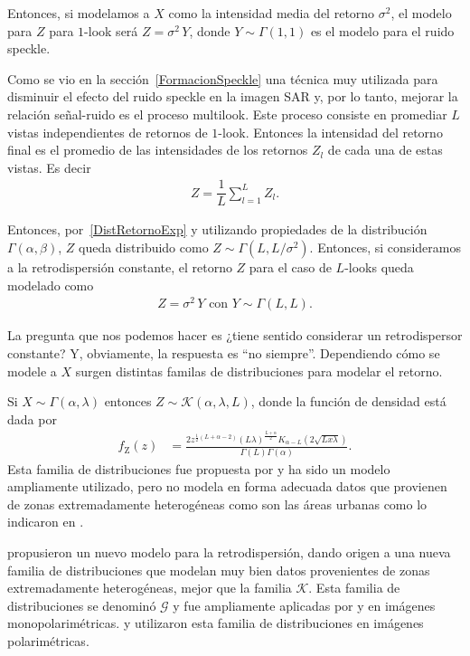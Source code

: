 Entonces, si modelamos a $X$ como la intensidad media del retorno $\sigma^2$, el modelo para $Z$ para $1$-look será $Z=\sigma^2 \, Y$, donde $Y \sim \Gamma(1,1)$ es el modelo para el ruido speckle.
 
Como se vio en la sección~\ref{FormacionSpeckle} una técnica muy utilizada para disminuir el efecto del ruido speckle en la imagen SAR y, por lo tanto, mejorar la relación señal-ruido es el proceso multilook. Este proceso consiste en promediar $L$ vistas independientes de retornos de $1$-look. Entonces la intensidad del retorno final es el promedio de las intensidades de los retornos $Z_l$ de cada una de estas vistas. Es decir 
\begin{align}
Z=\dfrac{1}{L}\sum_{l=1}^L Z_l.
\end{align}

Entonces, por~\eqref{DistRetornoExp} y utilizando propiedades de la distribución $\Gamma(\alpha,\beta)$, $Z$  queda distribuido como $Z \sim \Gamma(L,L/\sigma^2)$. Entonces, si consideramos a la retrodispersión constante, el retorno $Z$ para el caso de $L$-looks queda modelado como
\begin{align}
Z=\sigma^2 \, Y \text{ con } Y \sim \Gamma(L,L).
\end{align}

La pregunta que nos podemos hacer es ¿tiene sentido considerar un retrodispersor constante? Y, obviamente, la respuesta es ``no siempre''. 
Dependiendo cómo se modele a $X$ surgen distintas familas de distribuciones para modelar el retorno.

Si $X \sim \Gamma(\alpha,\lambda)$ entonces $Z \sim \mathcal{K}(\alpha,\lambda,L)$, donde la función de densidad está dada por
\begin{align}
f_{\text{Z}}(z)&=\frac{2 z^{\frac{1}{2} (L+\alpha-2 )} (L \lambda )^{\frac{L+\alpha }{2}} K_{\alpha -L}\left(2 \sqrt{L x
		\lambda }\right)}{\Gamma (L) \Gamma (\alpha )}.
\end{align}
Esta familia de distribuciones fue propuesta por \citet{Jakeman87} y ha sido un modelo ampliamente utilizado, pero no modela en forma adecuada datos que provienen de zonas extremadamente heterogéneas como son las áreas urbanas como lo indicaron en \citet{Frery97}.

\citet{Frery97} propusieron un nuevo modelo para la retrodispersión, dando origen a una nueva familia de distribuciones que modelan muy bien datos provenientes de zonas extremadamente heterogéneas, mejor que la familia $\mathcal{K}$. 
Esta familia de distribuciones se denominó $\mathcal{G}$ y fue ampliamente aplicadas por \citet{gambini2015} y \citet{Nascimento2009} en imágenes monopolarimétricas. 
\citet{Freitas2005} y \citet{Palacio2019} utilizaron esta familia de distribuciones en imágenes polarimétricas.


